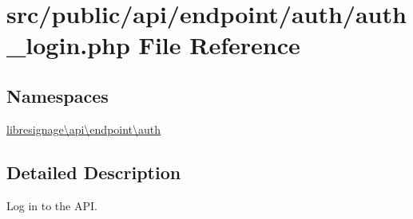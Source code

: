 \hypertarget{src_2public_2api_2endpoint_2auth_2auth__login_8php}{}\section{src/public/api/endpoint/auth/auth\+\_\+login.php File Reference}
\label{src_2public_2api_2endpoint_2auth_2auth__login_8php}
\subsection*{Namespaces}
\begin{DoxyCompactItemize}
\item 
 \hyperlink{namespacelibresignage_1_1api_1_1endpoint_1_1auth}{libresignage\textbackslash{}api\textbackslash{}endpoint\textbackslash{}auth}
\end{DoxyCompactItemize}


\subsection{Detailed Description}
Log in to the A\+PI.

